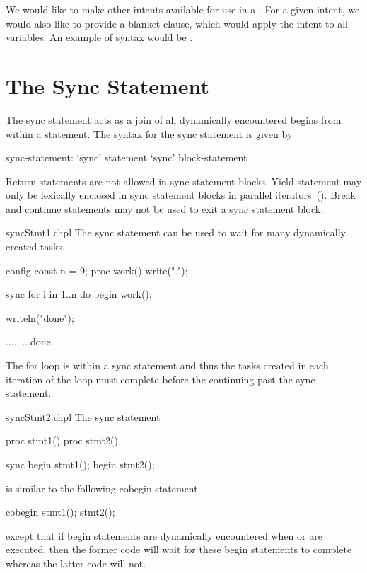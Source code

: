 \begin{future}
We would like to make other intents available for use in a
.
For a given intent, we would also like to provide a blanket clause,
which would apply the intent to all variables.
An example of syntax would be .
\end{future}


\section{The Sync Statement}
\label{Sync_Statement}

The sync statement acts as a join of all dynamically encountered
begins from within a statement.  The syntax for the sync statement is
given by
\begin{syntax}
sync-statement:
  `sync' statement
  `sync' block-statement
\end{syntax}

Return statements are not allowed in sync statement blocks.  Yield
statement may only be lexically enclosed in sync statement blocks in
parallel iterators~().  Break and continue
statements may not be used to exit a sync statement block.

\begin{chapelexample}{syncStmt1.chpl}
The sync statement can be used to wait for many dynamically created
tasks.
\begin{chapelpre}
config const n = 9;
proc work() {
  write(".");
}
\end{chapelpre}
\begin{chapel}
sync for i in 1..n do begin work();
\end{chapel}
\begin{chapelpost}
writeln("done");
\end{chapelpost}
\begin{chapeloutput}
.........done
\end{chapeloutput}
The for loop is within a sync statement and thus the tasks created
in each iteration of the loop must complete before the continuing past
the sync statement.
\end{chapelexample}

\begin{chapelexample}{syncStmt2.chpl}
The sync statement
\begin{chapelpre}
proc stmt1() { }
proc stmt2() { }
\end{chapelpre}
\begin{chapel}
sync {
  begin stmt1();
  begin stmt2();
}
\end{chapel}
is similar to the following cobegin statement
\begin{chapel}
cobegin {
  stmt1();
  stmt2();
}
\end{chapel}
\begin{chapeloutput}
\end{chapeloutput}
except that if begin statements are dynamically encountered
when  or  are executed, then the former
code will wait for these begin statements to complete whereas the
latter code will not.
\end{chapelexample}

